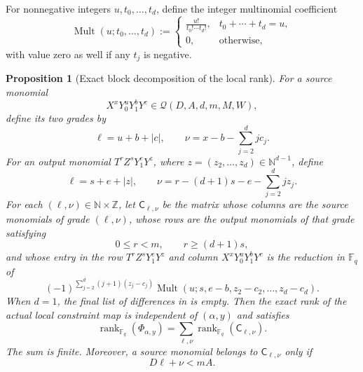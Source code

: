 \documentclass[11pt,letterpaper]{article}
\newtheorem{proposition}[proposition]{Proposition}
\theoremstyle{definition}
\newcommand{\F}{\mathbb{F}}
\newcommand{\N}{\mathbb{N}}
\newcommand{\rank}{\operatorname{rank}}
\newcommand{\Qspace}{\mathcal{Q}}
\begin{document}
For nonnegative integers \(u,t_0,\ldots,t_d\), define the integer
multinomial coefficient
\begin{equation}
  \operatorname{Mult}(u;t_0,\ldots,t_d)
  :=
  \begin{cases}
    \displaystyle\frac{u!}{t_0!\cdots t_d!},
      &t_0+\cdots+t_d=u,\\[1.2ex]
    0,&\text{otherwise},
  \end{cases}
  \label{eq:local-block-multinomial}
\end{equation}
with value zero as well if any \(t_j\) is negative.

\begin{proposition}[Exact block decomposition of the local rank]
\label{prop:exact-local-block-decomposition}
For a source monomial
\[
  X^xY_0^uY_1^bY^c
  \in\Qspace(D,A,d,m,M,W),
\]
define its two grades by
\begin{equation}
  \ell=u+b+|c|,
  \qquad
  \nu=x-b-\sum_{j=2}^{d}jc_j.
  \label{eq:source-local-grades}
\end{equation}
For an output monomial
\(T^rZ^sY_1^eY^z\), where
\(z=(z_2,\ldots,z_d)\in\N^{d-1}\), define
\begin{equation}
  \ell=s+e+|z|,
  \qquad
  \nu=r-(d+1)s-e-\sum_{j=2}^{d}jz_j.
  \label{eq:target-local-grades}
\end{equation}
For each \((\ell,\nu)\in\N\times\mathbb Z\), let
\(\mathsf C_{\ell,\nu}\) be the matrix whose columns are the source
monomials of grade \((\ell,\nu)\), whose rows are the output monomials of
that grade satisfying
\begin{equation}
  0\leq r<m,
  \qquad
  r\geq (d+1)s,
  \label{eq:local-block-row-range}
\end{equation}
and whose entry in the row
\(T^rZ^sY_1^eY^z\) and column
\(X^xY_0^uY_1^bY^c\) is the reduction in \(\F_q\) of
\begin{equation}
  (-1)^{\sum_{j=2}^{d}(j+1)(z_j-c_j)}
  \operatorname{Mult}
  \left(u;s,e-b,z_2-c_2,\ldots,z_d-c_d\right).
  \label{eq:local-block-entry}
\end{equation}
When \(d=1\), the final list of differences in
 is empty.
Then the exact rank of the actual local constraint map is independent of
\((\alpha,y)\) and satisfies
\begin{equation}
  \rank_{\F_q}(\Phi_{\alpha,y})
  =
  \sum_{\ell,\nu}\rank_{\F_q}(\mathsf C_{\ell,\nu}).
  \label{eq:exact-actual-local-rank}
\end{equation}
The sum is finite.  Moreover, a source monomial belongs to
\(\mathsf C_{\ell,\nu}\) only if
\begin{equation}
  D\ell+\nu<mA.
  \label{eq:block-grade-weight}
\end{equation}
\end{proposition}
\end{document}
